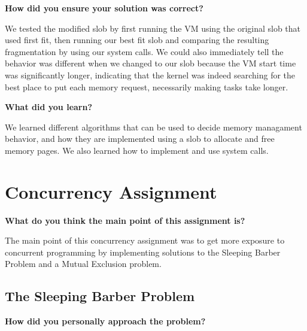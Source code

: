 \documentclass[10pt,letterpaper,draftclsnofoot,onecolumn]{IEEEtran}
\begin{document}
\noindent\textbf{How did you ensure your solution was correct?}
\medskip

\medskip

\noindent We tested the modified slob by first running the VM using the original slob that used first fit, then running our best fit slob and comparing the resulting fragmentation by using our system calls. We could also immediately tell the behavior was different when we changed to our slob because the VM start time was significantly longer, indicating that the kernel was indeed searching for the best place to put each memory request, necessarily making tasks take longer.

\bigskip

\noindent\textbf{What did you learn?}
\medskip

\medskip

\noindent We learned different algorithms that can be used to decide memory managament behavior, and how they are implemented using a slob to allocate and free memory pages. We also learned how to implement and use system calls.
\bigskip

\section{Concurrency Assignment}
\bigskip

\noindent\textbf{What do you think the main point of this assignment is?}
\medskip

\medskip

\noindent The main point of this concurrency assignment was to get more exposure to concurrent programming by implementing solutions to the Sleeping Barber Problem and a Mutual Exclusion problem. 

\bigskip

\subsection{The Sleeping Barber Problem}
\medskip

\noindent\textbf{How did you personally approach the problem?}
\medskip

\medskip
\end{document}
